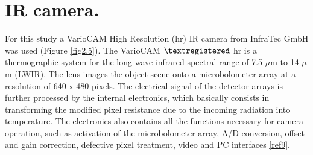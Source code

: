 	\section{IR camera.}\label{section2.3}
	
		For this study a VarioCAM High Resolution (hr) IR camera from InfraTec GmbH was used (Figure \ref{fig2.5}). The VarioCAM $\textregistered$ hr is a thermographic system for the long wave infrared spectral range of 7.5 $\mu$m to 14 $\mu$m (LWIR). The lens images the object scene onto a microbolometer array at a resolution of 640 x 480 pixels. The electrical signal of the detector arrays is further processed by the internal electronics, which basically consists in transforming the modified pixel resistance due to the incoming radiation into temperature. The electronics also contains all the functions necessary for camera operation, such as activation of the microbolometer array, A/D conversion, offset and gain correction, defective pixel treatment, video and PC interfaces \ref{ref9}.
		
